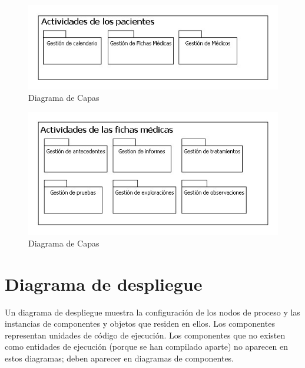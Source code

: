 \documentclass[a4paper,oneside,11pt]{book}
\begin{document}
		\begin{figure}[H]
		  \centering
		    \includegraphics[width=12cm]{img/jpg/dcapas/Actividades_Pacientes.jpg}
		  \caption{Diagrama de Capas}
		  \label{fig:dcapas_pacientes}
		\end{figure}
		
		\begin{figure}[H]
		  \centering
		    \includegraphics[width=12cm]{img/jpg/dcapas/fichas_medicas.jpg}
		  \caption{Diagrama de Capas}
		  \label{fig:dcapas_fichas}
		\end{figure}

		
	
	
	\newpage
	\section{Diagrama de despliegue} %
	\label{sec:diagrama_de_despliegue}
	
		Un diagrama de despliegue muestra la configuración de los nodos de proceso y las instancias de componentes y objetos que residen en ellos. Los componentes representan unidades de código de ejecución. Los componentes que no existen como entidades de ejecución (porque se han compilado aparte) no aparecen en estos diagramas; deben aparecer en diagramas de componentes.
		
		
\end{document}
